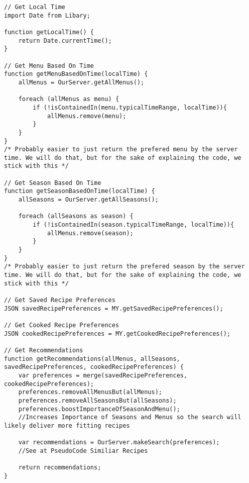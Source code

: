 \begin{lstlisting}[caption=Pseudocode - Empfehlungen,label={lst:Recommendations}]
// Get Local Time
import Date from Libary;

function getLocalTime() {
    return Date.currentTime();
}

// Get Menu Based On Time
function getMenuBasedOnTime(localTime) {
    allMenus = OurServer.getAllMenus();

    foreach (allMenus as menu) {
        if (!isContainedIn(menu.typicalTimeRange, localTime)){
            allMenus.remove(menu);
        }
    }
} 
/* Probably easier to just return the prefered menu by the server time. We will do that, but for the sake of explaining the code, we stick with this */

// Get Season Based On Time
function getSeasonBasedOnTime(localTime) {
    allSeasons = OurServer.getAllSeasons();

    foreach (allSeasons as season) {
        if (!isContainedIn(season.typicalTimeRange, localTime)){
            allMenus.remove(season);
        }
    }
} 
/* Probably easier to just return the prefered season by the server time. We will do that, but for the sake of explaining the code, we stick with this */

// Get Saved Recipe Preferences
JSON savedRecipePreferences = MY.getSavedRecipePreferences();

// Get Cooked Recipe Preferences
JSON cookedRecipePreferences = MY.getCookedRecipePreferences();

// Get Recommendations
function getRecommendations(allMenus, allSeasons, savedRecipePreferences, cookedRecipePreferences) {
    var preferences = merge(savedRecipePreferences, cookedRecipePreferences);
    preferences.removeAllMenusBut(allMenus);
    preferences.removeAllSeasonsBut(allSeasons);
    preferences.boostImportanceOfSeasonAndMenu(); 
    //Increases Importance of Seasons and Menus so the search will likely deliver more fitting recipes

    var recommendations = OurServer.makeSearch(preferences); 
    //See at PseudoCode Similiar Recipes

    return recommendations;
}
\end{lstlisting}
\newpage

\renewcommand\refname{Literaturverzeichnis}



\newpage
